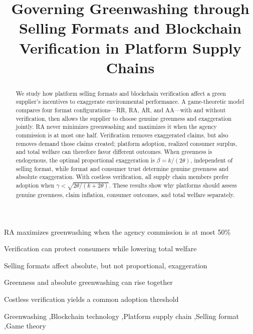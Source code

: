 \documentclass[preprint,review,12pt,authoryear,nopreprintline]{elsarticle}
\theoremstyle{definition}
\begin{document}
\begin{frontmatter}

\title{Governing Greenwashing through Selling Formats and Blockchain Verification in Platform Supply Chains}

\begin{abstract}
We study how platform selling formats and blockchain verification affect a green supplier's incentives to exaggerate environmental performance. A game-theoretic model compares four format configurations---RR, RA, AR, and AA---with and without verification, then allows the supplier to choose genuine greenness and exaggeration jointly. RA never minimizes greenwashing and maximizes it when the agency commission is at most one half. Verification removes exaggerated claims, but also removes demand those claims created; platform adoption, realized consumer surplus, and total welfare can therefore favor different outcomes. When greenness is endogenous, the optimal proportional exaggeration is $\beta=k/(2\theta)$, independent of selling format, while format and consumer trust determine genuine greenness and absolute exaggeration. With costless verification, all supply chain members prefer adoption when $\gamma<\sqrt{2\theta/(k+2\theta)}$. These results show why platforms should assess genuine greenness, claim inflation, consumer outcomes, and total welfare separately.
\end{abstract}

\begin{highlights}
\item RA maximizes greenwashing when the agency commission is at most 50\%
\item Verification can protect consumers while lowering total welfare
\item Selling formats affect absolute, but not proportional, exaggeration
\item Greenness and absolute greenwashing can rise together
\item Costless verification yields a common adoption threshold
\end{highlights}

\begin{keyword}
Greenwashing \sep Blockchain technology \sep Platform supply chain \sep Selling format \sep Game theory
\end{keyword}

\end{frontmatter}
\end{document}
